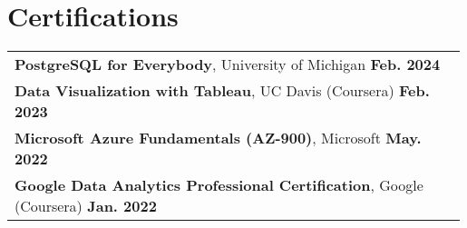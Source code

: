 \documentclass[letterpaper,11pt]{article}
\begin{document}
\section{Certifications}
\begin{tabular}{p{0.99\linewidth}}
    \hspace{0.15in}\textbf{PostgreSQL for Everybody}, University of Michigan
        \hfill \textbf{Feb. 2024} \\
    \hspace{0.15in}\textbf{Data Visualization with Tableau}, UC Davis (Coursera)
        \hfill \textbf{Feb. 2023} \\
    \hspace{0.15in}\textbf{Microsoft Azure Fundamentals (AZ-900)}, Microsoft
        \hfill \textbf{May. 2022} \\
    \hspace{0.15in}\textbf{Google Data Analytics Professional Certification}, Google (Coursera)
        \hfill \textbf{Jan. 2022}
\end{tabular}
\end{document}
